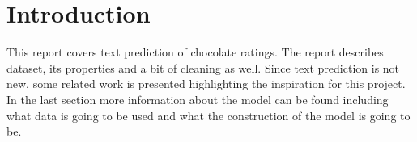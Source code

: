 \section{Introduction} %
This report covers text prediction of chocolate ratings. The report describes dataset, its properties and a bit of cleaning as well. Since text prediction is not new, some related work is presented highlighting the inspiration for this project. In the last section more information about the model can be found including what data is going to be used and what the construction of the model is going to be.